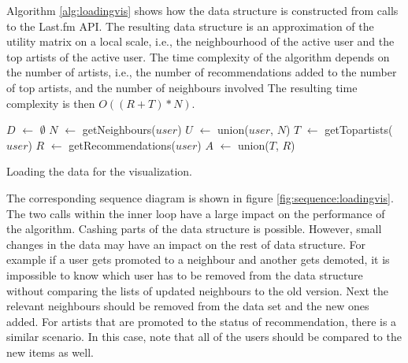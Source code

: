 Algorithm \ref{alg:loadingvis} shows how the data structure is constructed from calls to the Last.fm API. The resulting data structure is an approximation of the utility matrix on a local scale, i.e., the neighbourhood of the active user and the top artists of the active user. The time complexity of the algorithm depends on the number of artists, i.e., the number of recommendations added to the number of top artists, and the number of neighbours involved The resulting time complexity is then $O((R + T) * N)$.

\begin{algorithm}[H]
	\SetAlgoLined
	$D$ $\leftarrow$ $\emptyset$ \;
	$N$ $\leftarrow$ getNeighbours($user$)\;
	$U$ $\leftarrow$ union($user$, $N$)\;
	$T$ $\leftarrow$ getTopartists($user$)\;
	$R$ $\leftarrow$ getRecommendations($user$)\;
	$A$ $\leftarrow$ union($T$, $R$)\;
	\caption{Loading the data for the visualization.}
	\label{alg:loadingvis}
\end{algorithm}

The corresponding sequence diagram is shown in figure \ref{fig:sequence:loadingvis}. The two calls within the inner loop have a large impact on the performance of the algorithm. Cashing parts of the data structure is possible. However, small changes in the data may have an impact on the rest of data structure. For example if a user gets promoted to a neighbour and another gets demoted, it is impossible to know which user has to be removed from the data structure without comparing the lists of updated neighbours to the old version. Next the relevant neighbours should be removed from the data set and the new ones added. For artists that are promoted to the status of recommendation, there is a similar scenario. In this case, note that all of the users should be compared to the new items as well.


